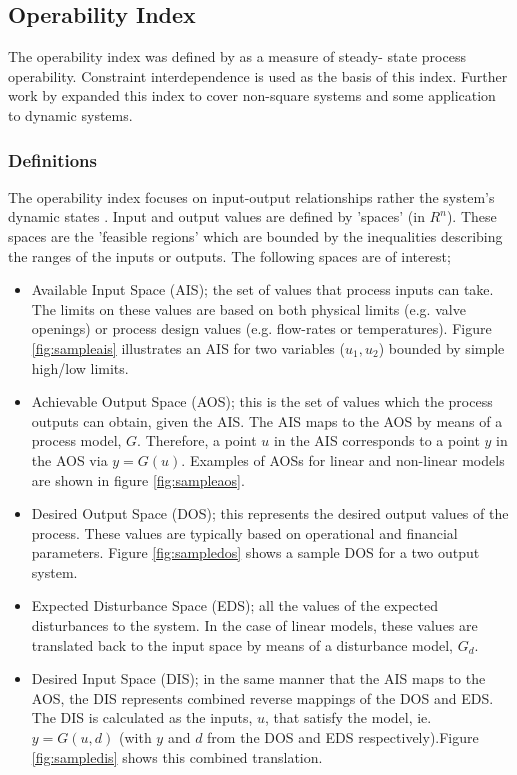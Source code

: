 \subsection{Operability Index}\label{sec:oi}
The operability index was defined by \citet{vinsonphd} as a measure of steady-
state process operability. Constraint interdependence is used as the basis of
this index. Further work by \citet{limaphd} expanded this index to cover
non-square systems and some application to dynamic systems.
\subsubsection{Definitions}
The operability index focuses on input-output relationships rather the system's
dynamic states \citep{vinsonphd}. Input and output values are defined by
'spaces' (in $R^n$). These spaces are the 'feasible regions' which are 
bounded by the inequalities describing the ranges of the inputs or outputs. The
following spaces are of interest;
\begin{itemize}
  \item Available Input Space (AIS); the set of values that process inputs can
    take. The limits on these values are based on both physical limits (e.g.
    valve openings) or process design values (e.g. flow-rates or temperatures).
    Figure \ref{fig:sampleais} illustrates an AIS for two variables ($u_1, u_2$)
    bounded by simple high/low limits.
  \item Achievable Output Space (AOS); this is the set of values which the 
    process outputs can obtain, given the AIS. The AIS maps to the AOS by means
    of a process model, $G$. Therefore, a point $u$ in the AIS corresponds to
    a point $y$ in the AOS via $y=G(u)$. Examples of AOSs for linear and
    non-linear models are shown in figure \ref{fig:sampleaos}.
  \item Desired Output Space (DOS); this represents the desired output values of
    the process. These values are typically based on operational and financial
    parameters. Figure \ref{fig:sampledos} shows a sample DOS for a two output
    system.
  \item Expected Disturbance Space (EDS); all the values of the expected 
    disturbances to the system. In the case of linear models, these values are 
    translated back to the input space by means of a disturbance model, $G_d$.
  \item Desired Input Space (DIS); in the same manner that the AIS maps to the
    AOS, the DIS represents combined reverse mappings of the DOS and EDS. The
    DIS is calculated as the inputs, $u$, that satisfy the model, ie.
    $y=G(u,d)$ (with $y$ and $d$ from the DOS and EDS respectively).Figure 
    \ref{fig:sampledis} shows this combined translation.
\end{itemize}

